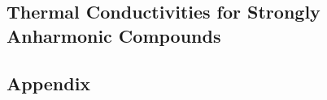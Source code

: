 \documentclass[nobib,a4paper,twoside,notoc,justified,marginals=justified]{tufte-book}
\begin{document}


\chapter{Thermal Conductivities for Strongly Anharmonic Compounds}

%
%
%

\cleardoublepage
{}
{}






\begin{appendices}
  \part*{Appendix}
  
\end{appendices}

\end{document}
